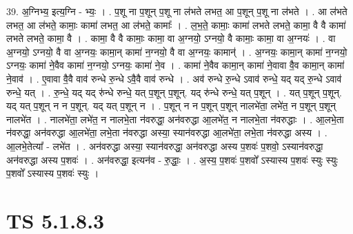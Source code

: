 \documentclass[17pt]{extarticle}
\begin{document}
39. अ॒ग्निभ्य॒ इत्य॒ग्नि - भ्यः॒ । . प॒शू ना प॒शून् प॒शू ना ल॑भते लभत॒ आ प॒शून् प॒शू ना ल॑भते । . आ ल॑भते लभत॒ आ ल॑भते॒ कामाः॒ कामा॑ लभत॒ आ ल॑भते॒ कामाः᳚ । . ल॒भ॒ते॒ कामाः॒ कामा॑ लभते लभते॒ कामा॒ वै वै कामा॑ लभते लभते॒ कामा॒ वै । . कामा॒ वै वै कामाः॒ कामा॒ वा अ॒ग्नयो॒ ऽग्नयो॒ वै कामाः॒ कामा॒ वा अ॒ग्नयः॑ । . वा अ॒ग्नयो॒ ऽग्नयो॒ वै वा अ॒ग्नयः॒ कामा॒न् कामा॑ न॒ग्नयो॒ वै वा अ॒ग्नयः॒ कामान्॑ । . अ॒ग्नयः॒ कामा॒न् कामा॑ न॒ग्नयो॒ ऽग्नयः॒ कामा॑ ने॒वैव कामा॑ न॒ग्नयो॒ ऽग्नयः॒ कामा॑ ने॒व । . कामा॑ ने॒वैव कामा॒न् कामा॑ ने॒वावा वै॒व कामा॒न् कामा॑ ने॒वाव॑ । . ए॒वावा वै॒वै वाव॑ रुन्धे रु॒न्धे ऽवै॒वै वाव॑ रुन्धे । . अव॑ रुन्धे रु॒न्धे ऽवाव॑ रुन्धे॒ यद् यद् रु॒न्धे ऽवाव॑ रुन्धे॒ यत् । . रु॒न्धे॒ यद् यद् रु॑न्धे रुन्धे॒ यत् प॒शून् प॒शून्. यद् रु॑न्धे रुन्धे॒ यत् प॒शून् । . यत् प॒शून् प॒शून्. यद् यत् प॒शून् न न प॒शून्. यद् यत् प॒शून् न । . प॒शून् न न प॒शून् प॒शून् नालभे॑ता॒ लभे॑त॒ न प॒शून् प॒शून् नालभे॑त । . नालभे॑ता॒ लभे॑त॒ न नालभे॒ता न॑वरुद्धा॒ अन॑वरुद्धा आ॒लभे॑त॒ न नालभे॒ता न॑वरुद्धाः । . आ॒लभे॒ता न॑वरुद्धा॒ अन॑वरुद्धा आ॒लभे॑ता॒ लभे॒ता न॑वरुद्धा अस्या॒ स्यान॑वरुद्धा आ॒लभे॑ता॒ लभे॒ता न॑वरुद्धा अस्य । . आ॒लभे॒तेत्या᳚ - लभे॑त । . अन॑वरुद्धा अस्या॒ स्यान॑वरुद्धा॒ अन॑वरुद्धा अस्य प॒शवः॑ प॒शवो॒ ऽस्यान॑वरुद्धा॒ अन॑वरुद्धा अस्य प॒शवः॑ । . अन॑वरुद्धा॒ इत्यन॑व - रु॒द्धाः॒ । . अ॒स्य॒ प॒शवः॑ प॒शवो᳚ ऽस्यास्य प॒शवः॑ स्युः स्युः प॒शवो᳚ ऽस्यास्य प॒शवः॑ स्युः । \newline
\pagebreak
{}

\section{ TS 5.1.8.3 }
\end{document}
